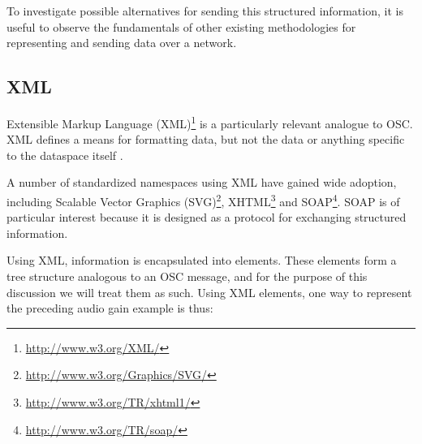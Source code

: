 \documentclass{NIME-alternate}
\begin{document}
To investigate possible alternatives for sending this structured information, it is useful to observe the fundamentals of other existing methodologies for representing and sending data over a network.

%
%
%



\subsection{XML} %
\label{sub:xml}

Extensible Markup Language (XML)\footnote{\url{http://www.w3.org/XML/}} is a particularly relevant analogue to OSC.  XML defines a means for formatting data, but not the data or anything specific to the dataspace itself \cite{xml:2006}. 

A number of standardized namespaces using XML have gained wide adoption, including Scalable Vector Graphics (SVG)\footnote{\url{http://www.w3.org/Graphics/SVG/}}, XHTML\footnote{\url{http://www.w3.org/TR/xhtml1/}} and SOAP\footnote{\url{http://www.w3.org/TR/soap/}}.  SOAP is of particular interest because it is designed as a protocol for exchanging structured information.

Using XML, information is encapsulated into elements.  These elements form a tree structure analogous to an OSC message, and for the purpose of this discussion we will treat them as such.  Using XML elements, one way to represent the preceding audio gain example is thus:
\end{document}
